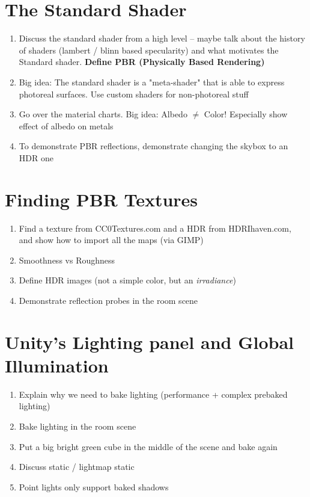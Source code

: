 \documentclass[11pt]{article}
\begin{document}
\section{The Standard Shader}

\begin{enumerate}
	\item Discuss the standard shader from a high level -- maybe talk about the history of shaders (lambert / blinn based specularity) and what motivates the Standard shader.  \textbf{Define PBR (Physically Based Rendering)}
	\item Big idea: The standard shader is a "meta-shader" that is able to express photoreal surfaces.  Use custom shaders for non-photoreal stuff
	\item Go over the material charts.  Big idea: Albedo $\neq$ Color!  Especially show effect of albedo on metals
	\item To demonstrate PBR reflections, demonstrate changing the skybox to an HDR one
\end{enumerate}

\section{Finding PBR Textures}

\begin{enumerate}
	\item Find a texture from CC0Textures.com and a HDR from HDRIhaven.com, and show how to import all the maps (via GIMP)
	\item Smoothness vs Roughness
	\item Define HDR images (not a simple color, but an \textit{irradiance})
	\item Demonstrate reflection probes in the room scene
\end{enumerate}

\section{Unity's Lighting panel and Global Illumination}

\begin{enumerate}
	\item Explain why we need to bake lighting (performance + complex prebaked lighting)
	\item Bake lighting in the room scene
	\item Put a big bright green cube in the middle of the scene and bake again
	\item Discuss static / lightmap static
	\item Point lights only support baked shadows
\end{enumerate}
\end{document}
